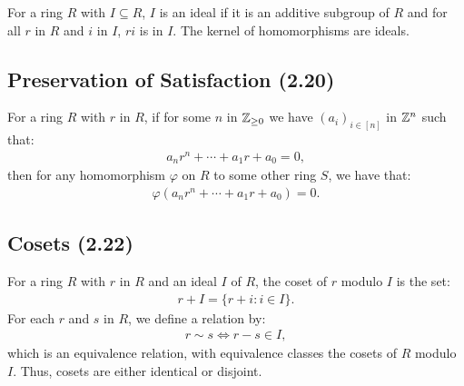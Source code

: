 For a ring $R$ with $I \subseteq R$, $I$ is an ideal if it is an additive
subgroup of $R$ and for all $r$ in $R$ and $i$ in $I$, $ri$ is in $I$.
The kernel of homomorphisms are ideals.

\subsection{Preservation of Satisfaction (2.20)} \label{2.20}

For a ring $R$ with $r$ in $R$, if for some $n$ in $\mathbb{Z}_{\geq 0}$ we have 
$(a_i)_{i \in [n]}$ in $\mathbb{Z}^n$ such that: \begin{align*}
    a_nr^n + \cdots + a_1r + a_0 = 0,
\end{align*} then for any homomorphism $\varphi$ on $R$ to some other ring $S$,
we have that: \begin{align*}
    \varphi(a_nr^n + \cdots + a_1r + a_0) = 0.
\end{align*}

\subsection{Cosets (2.22)} \label{2.22}

For a ring $R$ with $r$ in $R$ and an ideal $I$ of $R$, the coset of $r$ modulo $I$ is
the set: \begin{align*}
    r + I = \{r + i : i \in I\}.
\end{align*} For each $r$ and $s$ in $R$, we define a relation by: \begin{align*}
    r \sim s \Longleftrightarrow r - s \in I,
\end{align*} which is an equivalence relation, with equivalence classes the cosets of
$R$ modulo $I$. Thus, cosets are either identical or disjoint.
